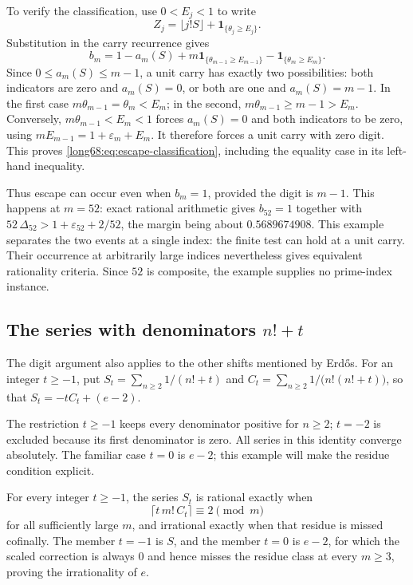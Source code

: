 \documentclass[11pt]{article}
\newcommand{\Ser}{S}
\begin{document}
To verify the classification, use $0<E_j<1$ to write
\[
 Z_j=\lfloor j!S\rfloor+\mathbf1_{\{\theta_j\ge E_j\}}.
\]
Substitution in the carry recurrence gives
\[
 b_m=1-a_m(S)+m\mathbf1_{\{\theta_{m-1}\ge E_{m-1}\}}
                 -\mathbf1_{\{\theta_m\ge E_m\}}.
\]
Since $0\le a_m(S)\le m-1$, a unit carry has exactly two possibilities:
both indicators are zero and $a_m(S)=0$, or both are one and
$a_m(S)=m-1$. In the first case $m\theta_{m-1}=\theta_m<E_m$;
in the second, $m\theta_{m-1}\ge m-1>E_m$.
Conversely, $m\theta_{m-1}<E_m<1$ forces $a_m(S)=0$ and both
indicators to be zero, using
$mE_{m-1}=1+\varepsilon_m+E_m$. It therefore forces a unit carry with
zero digit. This proves \eqref{long68:eq:escape-classification}, including
the equality case in its left-hand inequality.

Thus escape can occur even when $b_m=1$, provided the digit is $m-1$.
This happens at $m=52$: exact
rational arithmetic gives $b_{52}=1$ together with
$52\,\Delta_{52}>1+\varepsilon_{52}+2/52$, the margin being about
$0.5689674908$.  This example separates the two events at a single index: the finite test
can hold at a unit carry. Their occurrence at arbitrarily large indices
nevertheless gives equivalent rationality criteria. Since $52$ is
composite, the example supplies no prime-index instance.

\subsection{The series with denominators \texorpdfstring{$n!+t$}{n!+t}}

The digit argument also applies to the other shifts mentioned by
Erd\H{o}s. For an integer $t\ge-1$, put
$\Ser_t=\sum_{n\ge2}1/(n!+t)$ and $C_t=\sum_{n\ge2}1/\bigl(n!(n!+t)\bigr)$,
so that $\Ser_t=-tC_t+(e-2)$.

The restriction $t\ge-1$ keeps every denominator positive for $n\ge2$;
$t=-2$ is excluded because its first denominator is zero. All series in
this identity converge absolutely. The familiar case $t=0$ is $e-2$;
this example will make the residue condition explicit.

\begin{theorem}\label{long68:res:shift-family}
For every integer $t\ge-1$, the series $\Ser_t$ is rational exactly when
\[
 \bigl\lceil t\,m!\,C_t\bigr\rceil\equiv2\pmod m
\]
for all sufficiently large $m$, and irrational exactly when that residue is
missed cofinally.  The member $t=-1$ is $\Ser$, and the member $t=0$ is
$e-2$, for which the scaled correction is always $0$ and hence misses the residue class
at every $m\ge3$, proving the irrationality of $e$.
\end{theorem}
\end{document}
